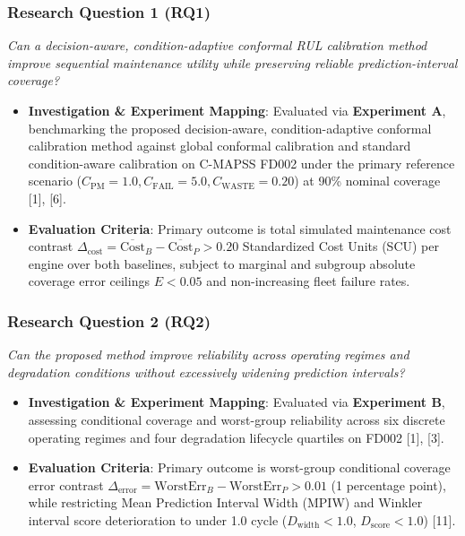 \documentclass[12pt,a4paper]{article}
\begin{document}
\subsubsection*{Research Question 1 (RQ1)}
\textit{Can a decision-aware, condition-adaptive conformal RUL calibration method improve sequential maintenance utility while preserving reliable prediction-interval coverage?}
\begin{itemize}
    \item \textbf{Investigation \& Experiment Mapping}: Evaluated via \textbf{Experiment A}, benchmarking the proposed decision-aware, condition-adaptive conformal calibration method against global conformal calibration and standard condition-aware calibration on C-MAPSS FD002 under the primary reference scenario ($C_{\text{PM}}=1.0, C_{\text{FAIL}}=5.0, C_{\text{WASTE}}=0.20$) at 90\% nominal coverage [1], [6].
    \item \textbf{Evaluation Criteria}: Primary outcome is total simulated maintenance cost contrast $\Delta_{\text{cost}} = \overline{\text{Cost}}_B - \overline{\text{Cost}}_P > 0.20$ Standardized Cost Units (SCU) per engine over both baselines, subject to marginal and subgroup absolute coverage error ceilings $E < 0.05$ and non-increasing fleet failure rates.
\end{itemize}

\subsubsection*{Research Question 2 (RQ2)}
\textit{Can the proposed method improve reliability across operating regimes and degradation conditions without excessively widening prediction intervals?}
\begin{itemize}
    \item \textbf{Investigation \& Experiment Mapping}: Evaluated via \textbf{Experiment B}, assessing conditional coverage and worst-group reliability across six discrete operating regimes and four degradation lifecycle quartiles on FD002 [1], [3].
    \item \textbf{Evaluation Criteria}: Primary outcome is worst-group conditional coverage error contrast $\Delta_{\text{error}} = \text{WorstErr}_B - \text{WorstErr}_P > 0.01$ (1 percentage point), while restricting Mean Prediction Interval Width (MPIW) and Winkler interval score deterioration to under 1.0 cycle ($D_{\text{width}} < 1.0$, $D_{\text{score}} < 1.0$) [11].
\end{itemize}
\end{document}

